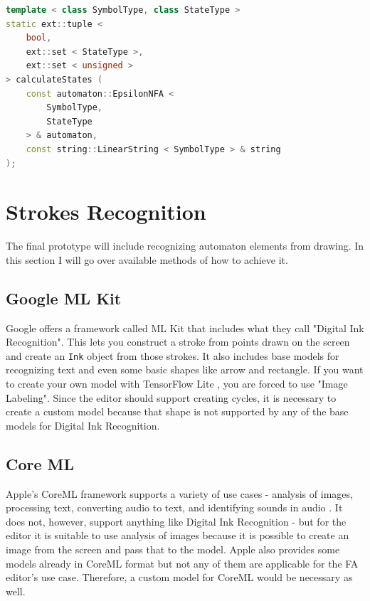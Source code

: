 \begin{lstlisting}[language=C++, caption=Run's calcuteStates function, label=calculate-states]
template < class SymbolType, class StateType >
static ext::tuple < 
    bool, 
    ext::set < StateType >, 
    ext::set < unsigned > 
> calculateStates ( 
    const automaton::EpsilonNFA < 
        SymbolType, 
        StateType 
    > & automaton, 
    const string::LinearString < SymbolType > & string
);
\end{lstlisting}

\section{Strokes Recognition}

The final prototype will include recognizing automaton elements from drawing. In this section I will go over available methods of how to achieve it.

\subsection{Google ML Kit}

Google offers a framework called ML Kit that includes what they call "Digital Ink Recognition". This lets you construct a stroke from points drawn on the screen and create an \lstinline{Ink} object from those strokes. It also includes base models for recognizing text and even some basic shapes like arrow and rectangle. If you want to create your own model with TensorFlow Lite \cite{tensorflow}, you are forced to use "Image Labeling". Since the editor should support creating cycles, it is necessary to create a custom model because that shape is not supported by any of the base models for Digital Ink Recognition.

\subsection{Core ML}

Apple's CoreML framework supports a variety of use cases - analysis of images, processing text, converting audio to text, and identifying sounds in audio \cite{coreml}. It does not, however, support anything like Digital Ink Recognition - but for the editor it is suitable to use analysis of images because it is possible to create an image from the screen and pass that to the model. Apple also provides some models already in CoreML format \cite{coreml-models} but not any of them are applicable for the FA editor's use case. Therefore, a custom model for CoreML would be necessary as well.


